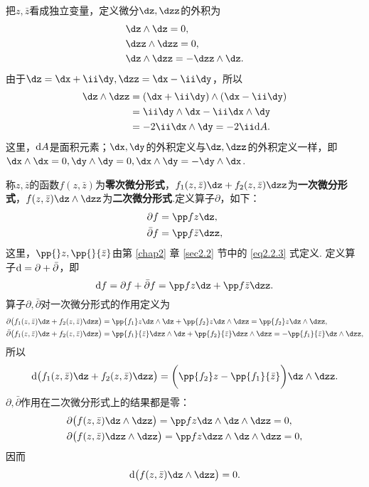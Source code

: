 把$z,\bar z$看成独立变量，定义微分$\dz,\dzz$的外积为
\begin{align*}
&\dz\wedge \dz=0,\\
&\dzz\wedge \dzz=0,\\
&\dz\wedge \dzz=-\dzz\wedge \dz.
\end{align*}
由于$\dz=\dx+\ii\dy,\dzz=\dx-\ii\dy$，所以
\begin{align*}
\dz\wedge\dzz&=(\dx+\ii\dy)\wedge(\dx-\ii\dy)\\
&=\ii\dy\wedge\dx-\ii\dx\wedge\dy\\
&=-2\ii\dx\wedge\dy=-2\ii\textrm dA.
\end{align*}
这里，$\textrm dA$是面积元素；$\dx,\dy$的外积定义与$\dz,\dzz$的外积定义一样，即$\dx\wedge\dx=0,\dy\wedge\dy=0,\dx\wedge\dy=-\dy\wedge\dx$.

称$z,\bar z$的函数$f(z,\bar z)$为\textbf{零次微分形式}，$f_1(z,\bar z)\dz+f_2(z,\bar z)\dzz$为\textbf{一次微分形式}，$f(z,\bar z)\dz\wedge\dzz$为\textbf{二次微分形式}.定义算子$\partial$，如下：
\begin{align*}
&\partial f=\pp fz\dz,\\
&\bar \partial f=\pp f{\bar z}\dzz,
\end{align*}
这里，$\pp{}z,\pp{}{\bar z}$由第 \ref{chap2} 章 \ref{sec2.2} 节中的 \eqref{eq2.2.3} 式定义. 定义算子$\textrm d=\partial+\bar\partial$，即
\begin{equation}\label{eq3.6.1}
\textrm df=\partial f+\bar\partial f=\pp fz\dz+\pp f{\bar z}\dzz.
\end{equation}
算子$\partial,\bar\partial$对一次微分形式的作用定义为
\begin{align*}
\partial\big(f_1(z,\bar z)\dz+f_2(z,\bar z)\dzz\big)
&=\pp{f_1}z\dz\wedge\dz+\pp{f_2}z\dz\wedge\dzz=\pp{f_2}z\dz\wedge\dzz,\\
\bar\partial\big(f_1(z,\bar z)\dz+f_2(z,\bar z)\dzz\big)
&=\pp{f_1}{\bar z}\dzz\wedge\dz+\pp{f_2}{\bar z}\dzz\wedge\dzz=-\pp{f_1}{\bar z}\dz\wedge\dzz,
\end{align*}
所以
\begin{equation}\label{eq3.6.2}
  \textrm d\big(f_1(z,\bar z)\dz+f_2(z,\bar z)\dzz\big)
  =\bigg(\pp{f_2}z-\pp{f_1}{\bar z}\bigg)\dz\wedge\dzz.
\end{equation}
$\partial,\bar\partial$作用在二次微分形式上的结果都是零：
\begin{align*}
&\partial\big(f(z,\bar z)\dz\wedge\dzz\big)=\pp fz\dz\wedge\dz\wedge\dzz=0,\\
&\partial\big(f(z,\bar z)\dzz\wedge\dzz\big)=\pp fz\dzz\wedge\dz\wedge\dzz=0,
\end{align*}
因而
\begin{equation}\label{eq3.6.3}
\textrm d\big(f(z,\bar z)\dz\wedge\dzz\big)=0.
\end{equation}

